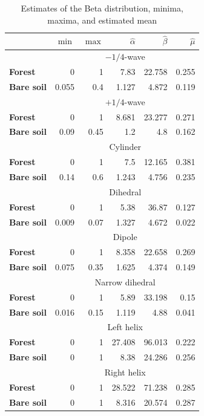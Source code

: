 \documentclass[conference]{IEEEtran}
\begin{document}
\begin{table}[hbt]
\centering
\caption{Estimates of the Beta distribution, minima, maxima, and estimated mean}\label{tab:estimated_params}     
\begin{tabular}{lrrrrr}
\toprule
& $\min$ & $\max$ & $\widehat\alpha$ & $\widehat\beta$ & $\widehat\mu$\\ \midrule
& \multicolumn{5}{c}{$-1/4$-wave}\\
\cmidrule(lr){2-6}
\textbf{Forest} & 0 & 1 & 7.83 & 22.758 & 0.255\\
\textbf{Bare soil} & 0.055 & 0.4 & 1.127 & 4.872 & 0.119\\
\midrule
%
& \multicolumn{5}{c}{$+1/4$-wave}\\
\cmidrule(lr){2-6}
\textbf{Forest} & 0 & 1 & 8.681 & 23.277 & 0.271\\
\textbf{Bare soil} & 0.09 & 0.45 & 1.2 & 4.8 & 0.162\\
\midrule
%
& \multicolumn{5}{c}{Cylinder}\\
\cmidrule(lr){2-6}
\textbf{Forest} & 0 & 1 & 7.5 & 12.165 & 0.381\\
\textbf{Bare soil} & 0.14 & 0.6 & 1.243 & 4.756 & 0.235\\
\midrule
%
& \multicolumn{5}{c}{Dihedral}\\
\cmidrule(lr){2-6}
\textbf{Forest} & 0 & 1 & 5.38 & 36.87 & 0.127\\
\textbf{Bare soil} & 0.009 & 0.07 & 1.327 & 4.672 & 0.022\\
\midrule
%
& \multicolumn{5}{c}{Dipole}\\
\textbf{Forest} & 0 & 1 & 8.358 & 22.658 & 0.269\\
\textbf{Bare soil} & 0.075 & 0.35 & 1.625 & 4.374 & 0.149\\
\midrule
%
& \multicolumn{5}{c}{Narrow dihedral}\\
\cmidrule(lr){2-6}
\textbf{Forest} & 0 & 1 & 5.89 & 33.198 & 0.15\\
\textbf{Bare soil} & 0.016 & 0.15 & 1.119 & 4.88 & 0.041\\
\midrule
%
& \multicolumn{5}{c}{Left helix}\\
\cmidrule(lr){2-6}
\textbf{Forest} & 0 & 1 & 27.408 & 96.013 & 0.222\\
\textbf{Bare soil} & 0 & 1 & 8.38 & 24.286 & 0.256\\
\midrule
& \multicolumn{5}{c}{Right helix}\\
\cmidrule(lr){2-6}
\textbf{Forest} & 0 & 1 & 28.522 & 71.238 & 0.285\\
\textbf{Bare soil} & 0 & 1 & 8.316 & 20.574 & 0.287\\

\end{tabular}
\end{table}
\end{document}

